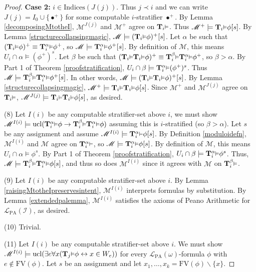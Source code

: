 \documentclass[reqno]{article}
\theoremstyle{definition}
\def\L{\mathscr{L}}
\def\M{\mathscr{M}}
\def\T{\mathbf{T}}
\def\indices{\mathrm{Indices}}
\def\FV{\mathrm{FV}}
\def\LPA{\L_{\mathrm{PA}}}
\def\indset{\mathcal I}
\renewcommand{\Pr}[1]{\T_{#1}\mbox{\small${\vDash}$}}
\newcommand{\Prr}[2]{\T^{#1}_{#2}\mbox{\small${\vDash}$}}
\newcommand{\ucl}[1]{\mathrm{ucl}(#1)}
\newcommand{\case}[1]{\textbf{Case #1:}}
\begin{document}
\begin{proof}
\item
\case2
$i\in\indices(J(j))$.
Thus $j\prec i$ and we can write $J(j)=I_0\cup\{\bullet^+\}$
for some computable $i$-stratifier $\bullet^+$.
By Lemma \ref{decomposingMtotheI}, $\M^{J(j)}$ and
$\M^+$ agree on $\Pr i$.
Thus $\M^+\models \Pr i\phi[s]$.
By Lemma \ref{structurecollapsingmagic},
$\M\models (\Pr i\phi)^+[s]$.
Let $\alpha$ be such that $(\Pr i\phi)^+\equiv \Prr\alpha i\phi^+$,
so $\M\models\Prr\alpha i\phi^+[s]$.
By definition of $\M$, this means
$U_i\cap\alpha\models(\phi^+)^s$.
Let $\beta$ be such that $(\Pr i \Pr i\phi)^+\equiv \Prr\beta i\Prr\alpha i\phi^+$,
so $\beta>\alpha$.
By Part 1 of Theorem \ref{proofstratification},
$U_i\cap\beta\models\Prr\alpha i(\phi^+)^s$.
Thus $\M\models\Prr\beta i\Prr\alpha i\phi^+[s]$.
In other words, $\M\models (\Pr i\Pr i\phi)^+[s]$.
By Lemma \ref{structurecollapsingmagic},
$\M^+\models \Pr i\Pr i\phi[s]$.
Since $\M^+$ and $\M^{J(j)}$ agree on $\Pr i$,
$\M^{J(j)}\models \Pr i\Pr i\phi[s]$, as desired.

\item
(8)
Let $I(i)$ be any computable stratifier-set above $i$,
we must show $\M^{I(i)}\models
\ucl{\Prr\alpha i\phi\rightarrow\Prr\beta i\Prr\alpha i\phi}$
assuming this is $i$-stratified (so $\beta>\alpha$).
Let $s$ be any assignment and assume $\M^{I(i)}\models\Prr\alpha i\phi[s]$.
By Definition \ref{moduloidefn}, $\M^{I(i)}$ and $\M$ agree on $\Prr\alpha i$,
so $\M\models\Prr\alpha i\phi[s]$.
By definition of $\M$, this means $U_i\cap\alpha\models \phi^s$.
By Part 1 of Theorem \ref{proofstratification},
$U_i\cap\beta\models \Prr\alpha i\phi^s$.
Thus, $\M\models \Prr\beta i\Prr\alpha i\phi[s]$,
and thus so does $\M^{I(i)}$ since it agrees with $\M$ on $\Prr\beta i$.

\item
(9)
Let $I(i)$ be any computable stratifier-set above $i$.
By Lemma \ref{raisingMtotheIpreservesintent}, $\M^{I(i)}$ interprets formulas
by substitution. By Lemma \ref{extendedpalemma}, $\M^{I(i)}$ satisfies the axioms
of Peano Arithmetic for $\LPA(\indset)$, as desired.

\item
(10)
Trivial.

\item
(11)
Let $I(i)$ be any computable stratifier-set above $i$.
We must show $\M^{I(i)}\models\ucl{\exists e\forall x(\Pr j\phi \leftrightarrow
x\in W_e)}$ for every $\LPA(\omega)$-formula $\phi$ with $e\not\in\FV(\phi)$.
Let $s$ be an assignment and let $x_1,\ldots,x_k=\FV(\phi)\backslash \{x\}$.



\end{proof}
\end{document}
